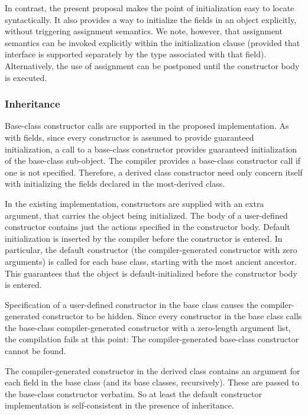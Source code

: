 In contrast, the present proposal makes the point of initialization
easy to locate syntactically.  It also provides a way to initialize the fields
in an object explicitly, without triggering assignment semantics.  
We note, however, that assignment semantics can be invoked explicitly within the
initialization clause (provided that interface is supported separately by the
type associated with that field).  Alternatively, the use of assignment can be
postponed until the constructor body is executed.

\subsubsection{Inheritance}

Base-class constructor calls are supported in the proposed implementation.  
As with fields, since every constructor is assumed to provide guaranteed initialization, a call
to a base-class constructor provides guaranteed initialization of the base-class
sub-object.  The compiler provides a base-class constructor call if one is not
specified.  Therefore, a derived class constructor need only concern itself with
initializing the fields declared in the most-derived class.

In the existing implementation, constructors are supplied with an extra 
argument, that carries the object being initialized.  The body of a user-defined
constructor contains just the
actions specified in the constructor body.  Default initialization is inserted
by the compiler before the constructor is entered.  In particular, the default
constructor (the compiler-generated constructor with zero arguments) is called
for each base class, starting with the most ancient ancestor.  This guarantees
that the object is default-initialized before the constructor body is entered.

Specification of a user-defined constructor in the base class causes the
compiler-generated constructor to be hidden.  Since every constructor in the
base class calls the base-class compiler-generated constructor with a
zero-length argument list, the compilation fails at this point: The
compiler-generated base-class constructor cannot be found.

The compiler-generated constructor in the derived class contains an argument for
each field in the base class (and its base classes, recursively).  These are
passed to the base-class constructor verbatim.  So at least the default
constructor implementation is self-consistent in the presence of inheritance.

